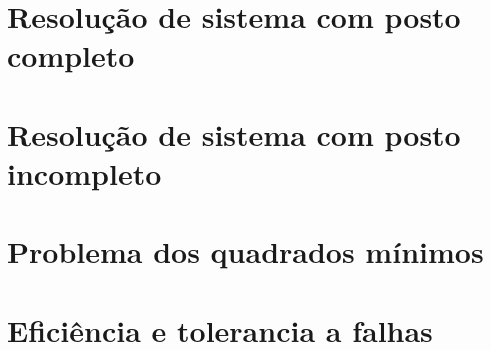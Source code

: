 \chapter{Resolução de sistema com posto completo}


\chapter{Resolução de sistema com posto incompleto}


\chapter{Problema dos quadrados mínimos}


\chapter{Eficiência e tolerancia a falhas}
